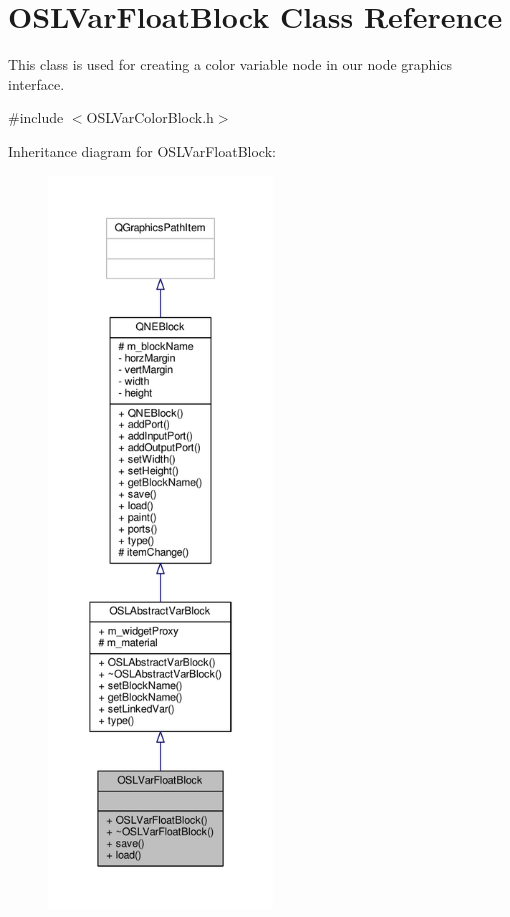 \hypertarget{class_o_s_l_var_float_block}{\section{O\-S\-L\-Var\-Float\-Block Class Reference}
\label{class_o_s_l_var_float_block}
}


This class is used for creating a color variable node in our node graphics interface.  




{\ttfamily \#include $<$O\-S\-L\-Var\-Color\-Block.\-h$>$}



Inheritance diagram for O\-S\-L\-Var\-Float\-Block\-:
\nopagebreak
\begin{figure}[H]
\begin{center}
\leavevmode
\includegraphics[height=550pt]{class_o_s_l_var_float_block__inherit__graph}
\end{center}
\end{figure}


